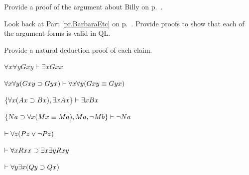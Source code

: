 \begin{earg}
\item
\begin{ndproof}
\open
\close
{}
\end{ndproof}

\item
\begin{ndproof}
\end{ndproof}

\item
\begin{ndproof}
\open
\close
{}
\end{ndproof}


\end{earg}



\problempart
Provide a proof of the argument about Billy on p.~\pageref{surgeon2}.



\problempart
\label{pr.BarbaraEtc.proof1}
Look back at Part \ref{pr.BarbaraEtc} on p.~\pageref{pr.BarbaraEtc}. Provide proofs to show that each of the argument forms is valid in QL.




\solutions
\problempart
\label{pr.QLproofsNDe}
Provide a natural deduction proof of each claim.
\begin{earg}
\item $\forall x \forall y Gxy\vdash\exists x Gxx$
\item $\forall x \forall y (Gxy \supset Gyx) \vdash \forall x\forall y (Gxy \equiv Gyx)$
\item $\{\forall x(Ax\supset Bx), \exists x Ax\} \vdash \exists x Bx$
\item $\{Na \supset \forall x(Mx \equiv Ma), Ma, \neg Mb\}\vdash \neg Na$
\item $\vdash\forall z (Pz \vee \neg Pz)$
\item $\vdash\forall x Rxx\supset \exists x \exists y Rxy$
\item $\vdash\forall y \exists x (Qy \supset Qx)$
\end{earg}



